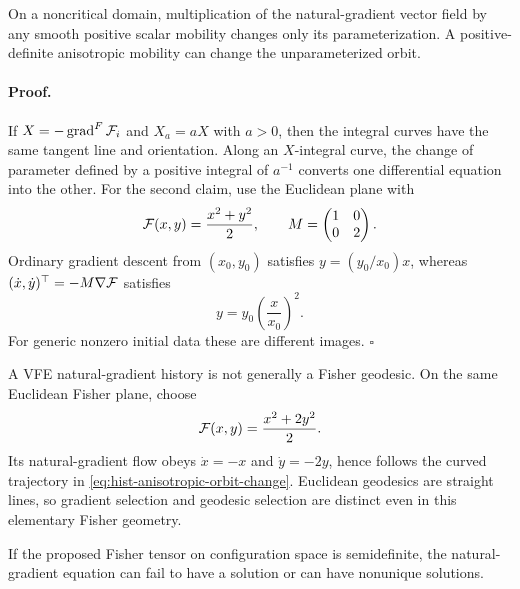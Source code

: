 On a noncritical domain, multiplication of the natural-gradient vector field
by any smooth positive scalar mobility changes only its parameterization.
A positive-definite anisotropic mobility can change the unparameterized
orbit.  

\paragraph{Proof.}
If $X=-\operatorname{grad}^F\mathcal F_i$ and $X_a=aX$ with $a>0$, then the
integral curves have the same tangent line and orientation.  Along an
$X$-integral curve, the change of parameter defined by a positive integral of
$a^{-1}$ converts one differential equation into the other.  For the second
claim, use the Euclidean plane with
\begin{equation}
\mathcal F(x,y)=\frac{x^2+y^2}{2},
\qquad
M=\begin{pmatrix}1&0\\0&2\end{pmatrix}.
\label{eq:hist-anisotropic-mobility-example}
\end{equation}
Ordinary gradient descent from $(x_0,y_0)$ satisfies
$y=(y_0/x_0)x$, whereas
$(\dot x,\dot y)^\top=-M\nabla\mathcal F$ satisfies
\begin{equation}
y=y_0\left(\frac{x}{x_0}\right)^2.
\label{eq:hist-anisotropic-orbit-change}
\end{equation}
For generic nonzero initial data these are different images.  $\square$

A VFE natural-gradient history is not generally a Fisher geodesic.  On the
same Euclidean Fisher plane, choose
\begin{equation}
\mathcal F(x,y)=\frac{x^2+2y^2}{2}.
\label{eq:hist-natural-gradient-nongeodesic}
\end{equation}
Its natural-gradient flow obeys $\dot x=-x$ and $\dot y=-2y$, hence follows
the curved trajectory in \eqref{eq:hist-anisotropic-orbit-change}.  Euclidean
geodesics are straight lines, so gradient selection and geodesic selection
are distinct even in this elementary Fisher geometry.  

If the proposed Fisher tensor on configuration space is semidefinite, the
natural-gradient equation can fail to have a solution or can have nonunique
solutions.  

